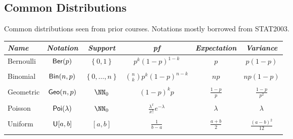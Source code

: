 \subsection*{Common Distributions}

Common distributions seen from prior courses. Notations mostly borrowed from STAT2003.

\begin{longtable}{lccccc}                                                                                                                                                                                                                                   \\\bottomrule
    \hline
    \emph{Name} & \emph{Notation}          & \emph{Support}                 & \emph{pf}                                                                                                & \emph{Expectation}       & \emph{Variance}            \\\midrule
    Bernoulli   & ${\sf Ber} (p)$               & $\left\{ 0,1 \right\}$         & $p^k (1-p)^{1-k}$                                                                                        & $p$                      & $p(1-p)$                   \\\\
    Binomial    & ${\sf Bin} (n,p)$             & $\left\{ 0,\ldots ,n \right\}$ & $\binom{n}{k} p^{k} (1-p)^{n-k}$                                                                         & $np$                     & $np(1-p)$                  \\\\
    Geometric   & ${\sf Geo} (n,p)$             & $\NN_{0}$                      & $(1-p)^k p$                                                                                              & $\frac{1-p}{p}$          & $\frac{1-p}{p^2}$          \\\\
    Poisson     & ${\sf Poi} (\lambda)$         & $\NN_{0}$                      & $\frac{\lambda^x}{x!}e^{-\lambda}$                                                                       & $\lambda$                & $\lambda$                  \\\\
    Uniform     & ${\sf U} [a,b]$             & $[a,b]$                        & $\frac{1}{b-a}$                                                                                          & $\frac{a+b}{2}$          & $\frac{(a-b)^2}{12}$       \\\\

\end{longtable}
